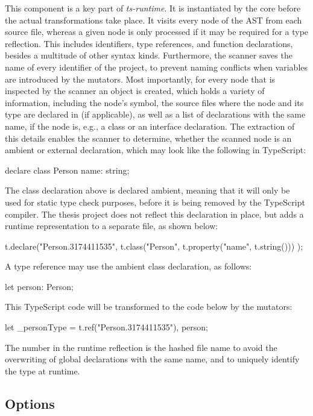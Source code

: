 This component is a key part of \emph{ts-runtime}. It is instantiated by the core before the actual transformations take place. It visits every node of the AST from each source file, whereas a given node is only processed if it may be required for a type reflection. This includes identifiers, type references, and function declarations, besides a multitude of other syntax kinds. Furthermore, the scanner saves the name of every identifier of the project, to prevent naming conflicts when variables are introduced by the mutators. Most importantly, for every node that is inspected by the scanner an object is created, which holds a variety of information, including the node's symbol, the source files where the node and its type are declared in (if applicable), as well as a list of declarations with the same name, if the node is, e.g., a class or an interface declaration. The extraction of this details enables the scanner to determine, whether the scanned node is an ambient or external declaration, which may look like the following in TypeScript:
\begin{JsCode}[numbers=none]
declare class Person {
  name: string;
}
\end{JsCode}
The class declaration above is declared ambient, meaning that it will only be used for static type check purposes, before it is being removed by the TypeScript compiler. The thesis project does not reflect this declaration in place, but adds a runtime representation to a separate file, as shown below:
\begin{JsCode}[numbers=none]
t.declare("Person.3174411535",
  t.class("Person", t.property("name", t.string()))
);
\end{JsCode}
A type reference may use the ambient class declaration, as follows:
\begin{JsCode}[numbers=none]
let person: Person;
\end{JsCode}
This TypeScript code will be transformed to the code below by the mutators:
\begin{JsCode}[numbers=none]
let _personType = t.ref("Person.3174411535"), person;
\end{JsCode}
The number in the runtime reflection is the hashed file name to avoid the overwriting of global declarations with the same name, and to uniquely identify the type at runtime.

\subsection{Options}
\label{sec:options}

